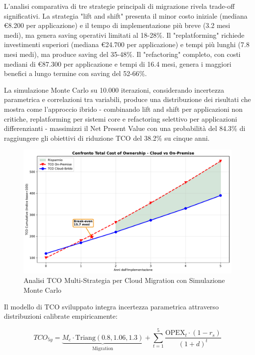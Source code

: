 L'analisi comparativa di tre strategie principali di migrazione rivela trade-off significativi. La strategia "lift and shift" presenta il minor costo iniziale (mediana €8.200 per applicazione) e il tempo di implementazione più breve (3.2 mesi medi), ma genera saving operativi limitati al 18-28\%. Il "replatforming" richiede investimenti superiori (mediana €24.700 per applicazione) e tempi più lunghi (7.8 mesi medi), ma produce saving del 35-48\%. Il "refactoring" completo, con costi mediani di €87.300 per applicazione e tempi di 16.4 mesi, genera i maggiori benefici a lungo termine con saving del 52-66\%.

La simulazione Monte Carlo su 10.000 iterazioni, considerando incertezza parametrica e correlazioni tra variabili, produce una distribuzione dei risultati che mostra come l'approccio ibrido - combinando lift and shift per applicazioni non critiche, replatforming per sistemi core e refactoring selettivo per applicazioni differenzianti - massimizzi il Net Present Value con una probabilità del 84.3\% di raggiungere gli obiettivi di riduzione TCO del 38.2\% su cinque anni.

\begin{figure}[htbp]
\centering
\includegraphics[width=\textwidth]{thesis_figures/cap3/fig_3_4_tco_comparison.pdf}
\caption{Analisi TCO Multi-Strategia per Cloud Migration con Simulazione Monte Carlo}
\label{fig:cloud_tco}
\end{figure}

Il modello di TCO sviluppato integra incertezza parametrica attraverso 
distribuzioni calibrate empiricamente:

\begin{equation}
TCO_{5y} = \underbrace{M_c \cdot \text{Triang}(0.8, 1.06, 1.3)}_{\text{Migration}} + 
           \sum_{t=1}^{5} \frac{\text{OPEX}_t \cdot (1-r_s)}{(1+d)^t}
\end{equation}

